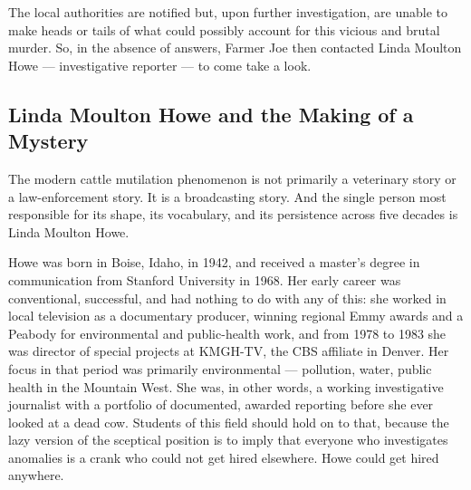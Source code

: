 
The local authorities are notified but, upon further investigation, are unable to make heads or
tails of what could possibly account for this vicious and brutal murder. So, in the absence of
answers, Farmer Joe then contacted Linda Moulton Howe --- investigative reporter --- to come take a
look.

\subsection{Linda Moulton Howe and the Making of a Mystery}

 The
modern cattle mutilation phenomenon is not primarily a veterinary story or a law-enforcement
story. It is a broadcasting story. And the single person most responsible for its shape, its
vocabulary, and its persistence across five decades is Linda Moulton Howe.

Howe was born in Boise, Idaho, in 1942, and received a master's degree in communication from
Stanford University in 1968. Her early career was conventional, successful, and had nothing to do
with any of this: she worked in local television as a documentary producer, winning regional Emmy
awards and a Peabody for environmental and public-health work, and from 1978 to 1983 she was
director of special projects at KMGH-TV, the CBS affiliate in Denver. Her focus in that period was
primarily environmental --- pollution, water, public health in the Mountain West. She was, in
other words, a working investigative journalist with a portfolio of documented, awarded reporting
before she ever looked at a dead cow. Students of this field should hold on to that, because the
lazy version of the sceptical position is to imply that everyone who investigates anomalies is a
crank who could not get hired elsewhere. Howe could get hired anywhere.

